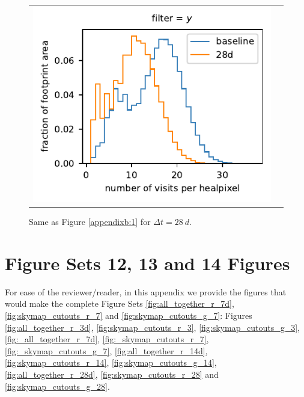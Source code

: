\documentclass[preprintm,linenumbers]{aastex631}
\begin{document}
\begin{figure}
\begin{tabular}{@{}c@{}c@{}}
				\includegraphics{results/histograms/hist_first_year_one_snap_v4_0_10yrs_db_noDD_noTwi_CountMetric_doAllTemplateMetrics_reduceCount_y_28_noDD_noTwi.pdf} \\
    			
			\end{tabular}
			\caption{ Same as Figure \ref{appendixb:1} for $\Delta t = 28\ \si{d}$. \label{appendixb:4}}
		\end{figure}

  \section{Figure Sets 12, 13 and 14 Figures}

    For ease of the reviewer/reader, in this appendix we provide the figures that would make the complete Figure Sets \ref{fig:all_together_r_7d}, \ref{fig:skymap_cutouts_r_7} and \ref{fig:skymap_cutouts_g_7}: Figures 
    \ref{fig:all_together_r_3d}, \ref{fig:skymap_cutouts_r_3}, \ref{fig:skymap_cutouts_g_3},
    \ref{fig:_all_together_r_7d}, \ref{fig:_skymap_cutouts_r_7}, \ref{fig:_skymap_cutouts_g_7},
    \ref{fig:all_together_r_14d}, \ref{fig:skymap_cutouts_r_14}, \ref{fig:skymap_cutouts_g_14},
    \ref{fig:all_together_r_28d}, \ref{fig:skymap_cutouts_r_28} and \ref{fig:skymap_cutouts_g_28}.
\end{document}
